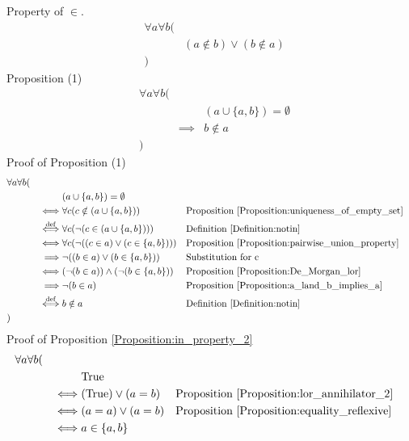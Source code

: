 \begin{prop}
\label{Proposition:in_property_2}
Property of $\in$.
\begin{align*}
& \forall a \forall b ( \\
& & (a \notin b) \lor (b \notin a) \\
& )
\end{align*}
Proposition (1)
\begin{align*}
& \forall a \forall b ( \\
& & & (a \cup \{ a , b \}) = \emptyset \\
& & \implies & b \notin a \\
& )
\end{align*}
Proof of Proposition (1)
\begin{align*}
& \forall a \forall b ( \\
& & & (a \cup \{ a , b \}) = \emptyset \\
& & \iff & \forall c (c \notin (a \cup \{ a , b \}))
& & \text{Proposition \ref{Proposition:uniqueness_of_empty_set}} \\
& & \overset{\operatorname{def}}{\iff} & \forall c (\lnot (c \in (a \cup \{ a , b \})))
& & \text{Definition \ref{Definition:notin}} \\
& & \iff & \forall c (\lnot ((c \in a) \lor (c \in \{ a , b \})))
& & \text{Proposition \ref{Proposition:pairwise_union_property}} \\
& & \implies & \lnot ((b \in a) \lor (b \in \{ a , b \}))
& & \text{Substitution for c} \\
& & \iff & (\lnot (b \in a)) \land (\lnot (b \in \{ a , b \}))
& & \text{Proposition \ref{Proposition:De_Morgan_lor}} \\
& & \implies & \lnot (b \in a)
& & \text{Proposition \ref{Proposition:a_land_b_implies_a}} \\
& & \overset{\operatorname{def}}{\iff} & b \notin a
& & \text{Definition \ref{Definition:notin}} \\
& )
\end{align*}
Proof of Proposition \ref{Proposition:in_property_2}
\begin{align*}
& \forall a \forall b ( \\
& & & \text{True} \\
& & \iff & (\text{True}) \lor (a = b)
& & \text{Proposition \ref{Proposition:lor_annihilator_2}} \\
& & \iff & (a = a) \lor (a = b)
& & \text{Proposition \ref{Proposition:equality_reflexive}} \\
& & \iff & a \in \{ a , b \}

\end{align*}
\end{prop}
